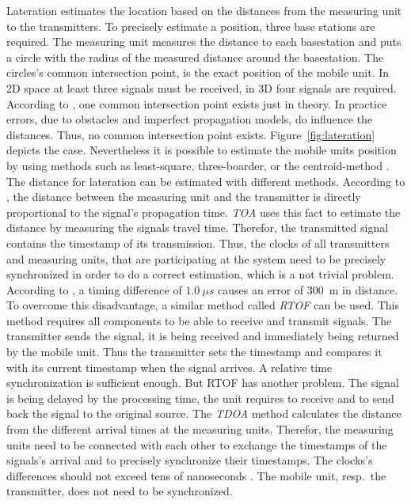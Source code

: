 Lateration estimates the location based on the distances from the measuring unit to the transmitters. To precisely estimate a position, three base stations are required. The measuring unit measures the distance to each basestation and puts a circle with the radius of the measured distance around the basestation. The circles's common intersection point, is the exact position of the mobile unit. In 2D space at least three signals must be received, in 3D four signals are required. According to \citet{wang:bt_pos}, one common intersection point exists just in theory. In practice errors, due to obstacles and imperfect propagation models, do influence the distances. Thus, no common intersection point exists. Figure~\ref{fig:lateration} depicts the case. Nevertheless it is possible to estimate the mobile units position by using methods such as least-square, three-boarder, or the centroid-method \citep{wang:bt_pos, IEEE:survey_wireless_indoor_pos}.  
The distance for lateration can be estimated with different methods. According to \citet{IEEE:survey_wireless_indoor_pos}, the distance between the measuring unit and the transmitter is directly proportional to the signal's propagation time.
\emph{\ac{TOA}} uses this fact to estimate the distance by measuring the signals travel time. Therefor, the transmitted signal contains the timestamp of its transmission. Thus, the clocks of all transmitters and measuring units, that are participating at the system need to be precisely synchronized in order to do a correct estimation, which is a not trivial problem. According to \citet{kotanen:exp_local_pos_bt}, a timing difference of  $1.0~\mu s$ causes an error of 300~m in distance.
To overcome this disadvantage, a similar method called \emph{\ac{RTOF}} can be used. This method requires all components to be able to receive and transmit signals. The transmitter sends the signal, it is being received and immediately being returned by the mobile unit. Thus the transmitter sets the timestamp and compares it with its current timestamp when the signal arrives. A relative time synchronization is sufficient enough. But \acs{RTOF} has another problem. The signal is being delayed by the processing time, the unit requires to receive and to send back the signal to the original source.
The \emph{\ac{TDOA}} method calculates the distance from the different arrival times at the measuring units. Therefor, the measuring units need to be connected with each other to exchange the timestamps of the signals's arrival and to precisely synchronize their timestamps. The clocks's differences should not exceed tens of nanoseconds \citep{kotanen:exp_local_pos_bt}. The mobile unit, resp.\ the transmitter, does not need to be synchronized. 
